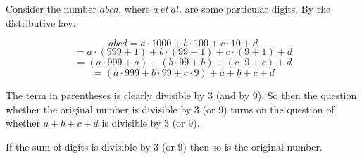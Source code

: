 \documentclass[11pt, oneside]{article}
\begin{document}
Consider the number $abcd$, where $a \ et \ al.$ are some particular digits.  By the distributive law:

\[ abcd = a \cdot 1000 + b \cdot 100 + c \cdot 10 + d \]
\[ = a \cdot (999 + 1) +b \cdot (99 + 1) + c \cdot (9 + 1)+ d \]
\[ = (a \cdot 999 + a) +( b \cdot 99 + b) + (c \cdot 9 + c )+ d \]
\[ = (a \cdot 999 + b \cdot 99+ c \cdot 9) + a + b  + c + d \]

The term in parentheses is clearly divisible by $3$ (and by $9$).  So then the question whether the original number is divisible by $3$ (or $9$) turns on the question of whether $a + b + c + d$ is divisible by $3$ (or $9$).

If the sum of digits is divisible by $3$ (or $9$) then so is the original number.
\end{document}
